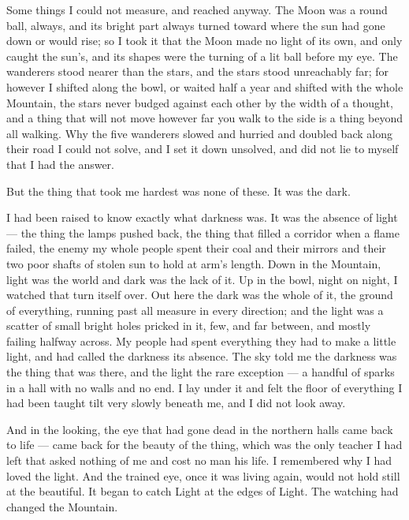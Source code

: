 Some things I could not measure, and reached anyway. The Moon was a round ball, always, and its bright part always turned toward where the sun had gone down or would rise; so I took it that the Moon made no light of its own, and only caught the sun's, and its shapes were the turning of a lit ball before my eye. The wanderers stood nearer than the stars, and the stars stood unreachably far; for however I shifted along the bowl, or waited half a year and shifted with the whole Mountain, the stars never budged against each other by the width of a thought, and a thing that will not move however far you walk to the side is a thing beyond all walking. Why the five wanderers slowed and hurried and doubled back along their road I could not solve, and I set it down unsolved, and did not lie to myself that I had the answer.\par

But the thing that took me hardest was none of these. It was the dark.\par

I had been raised to know exactly what darkness was. It was the absence of light --- the thing the lamps pushed back, the thing that filled a corridor when a flame failed, the enemy my whole people spent their coal and their mirrors and their two poor shafts of stolen sun to hold at arm's length. Down in the Mountain, light was the world and dark was the lack of it. Up in the bowl, night on night, I watched that turn itself over. Out here the dark was the whole of it, the ground of everything, running past all measure in every direction; and the light was a scatter of small bright holes pricked in it, few, and far between, and mostly failing halfway across. My people had spent everything they had to make a little light, and had called the darkness its absence. The sky told me the darkness was the thing that was there, and the light the rare exception --- a handful of sparks in a hall with no walls and no end. I lay under it and felt the floor of everything I had been taught tilt very slowly beneath me, and I did not look away.\par

And in the looking, the eye that had gone dead in the northern halls came back to life --- came back for the beauty of the thing, which was the only teacher I had left that asked nothing of me and cost no man his life. I remembered why I had loved the light. And the trained eye, once it was living again, would not hold still at the beautiful. It began to catch Light at the edges of Light. The watching had changed the Mountain.\par

